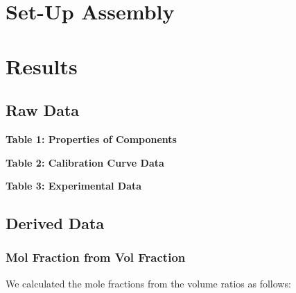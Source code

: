 \documentclass[11pt]{article}
\begin{document}
\hypertarget{set-up-assembly}{%
  \section{Set-Up Assembly}\label{set-up-assembly}}

\begin{center}
\end{center}
\pagebreak

\hypertarget{results}{%
  \section{Results}\label{results}}

\hypertarget{raw-data}{%
  \subsection{Raw Data}\label{raw-data}}

\textbf{Table 1: Properties of Components}

\begin{center}
\end{center}

\textbf{Table 2: Calibration Curve Data}

\begin{center}
\end{center}

\textbf{Table 3: Experimental Data}

\begin{center}
\end{center}

\pagebreak
\hypertarget{derived-data}{%
  \subsection{Derived Data}\label{derived-data}}

\hypertarget{mol-fraction-from-vol-fraction}{%
  \subsubsection{Mol Fraction from Vol
    Fraction}\label{mol-fraction-from-vol-fraction}}

We calculated the mole fractions from the volume ratios as follows:
\end{document}
